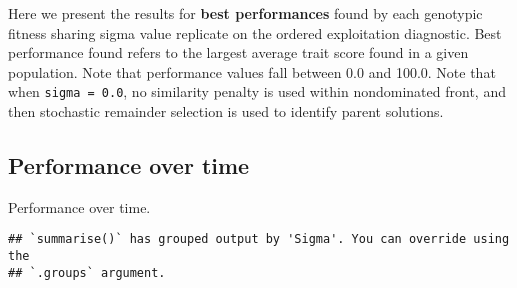 \documentclass[]{book}
\newenvironment{Shaded}{\begin{snugshade}}{\end{snugshade}}
\newcommand{\DataTypeTok}[1]{\textcolor[rgb]{0.13,0.29,0.53}{#1}}
\newcommand{\KeywordTok}[1]{\textcolor[rgb]{0.13,0.29,0.53}{\textbf{#1}}}
\newcommand{\NormalTok}[1]{#1}
\newcommand{\OperatorTok}[1]{\textcolor[rgb]{0.81,0.36,0.00}{\textbf{#1}}}
\newcommand{\StringTok}[1]{\textcolor[rgb]{0.31,0.60,0.02}{#1}}
\begin{document}
Here we present the results for \textbf{best performances} found by each genotypic fitness sharing sigma value replicate on the ordered exploitation diagnostic.
Best performance found refers to the largest average trait score found in a given population.
Note that performance values fall between 0.0 and 100.0.
Note that when \texttt{sigma\ =\ 0.0}, no similarity penalty is used within nondominated front, and then stochastic remainder selection is used to identify parent solutions.

\hypertarget{performance-over-time-19}{%
\subsection{Performance over time}\label{performance-over-time-19}}

Performance over time.

\begin{Shaded}
\end{Shaded}

\begin{verbatim}
## `summarise()` has grouped output by 'Sigma'. You can override using the
## `.groups` argument.
\end{verbatim}
\end{document}
